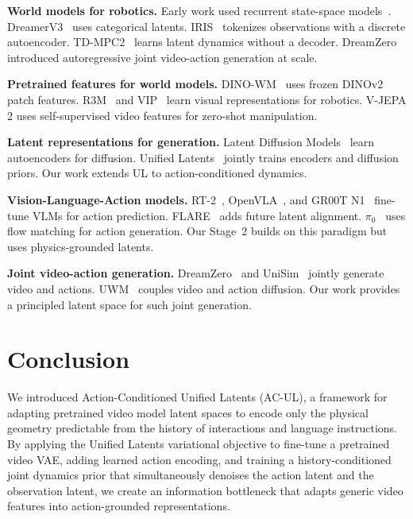 \documentclass{article}
\begin{document}
\textbf{World models for robotics.}
Early work used recurrent state-space models~\citep{ha2018world,hafner2019dream}. DreamerV3~\citep{hafner2023dreamerv3} uses categorical latents. IRIS~\citep{micheli2023transformers} tokenizes observations with a discrete autoencoder. TD-MPC2~\citep{hansen2024tdmpc2} learns latent dynamics without a decoder. DreamZero~\citep{dreamzero2025} introduced autoregressive joint video-action generation at scale.

\textbf{Pretrained features for world models.}
DINO-WM~\citep{zhou2024dinowm} uses frozen DINOv2 patch features. R3M~\citep{nair2022r3m} and VIP~\citep{ma2023vip} learn visual representations for robotics. V-JEPA 2 uses self-supervised video features for zero-shot manipulation.

\textbf{Latent representations for generation.}
Latent Diffusion Models~\citep{rombach2022high} learn autoencoders for diffusion. Unified Latents~\citep{heek2025ul} jointly trains encoders and diffusion priors. Our work extends UL to action-conditioned dynamics.

\textbf{Vision-Language-Action models.}
RT-2~\citep{brohan2023rt2}, OpenVLA~\citep{kim2024openvla}, and GR00T N1~\citep{nvidia2025groot} fine-tune VLMs for action prediction. FLARE~\citep{nvidia2025flare} adds future latent alignment. $\pi_0$~\citep{pi02024} uses flow matching for action generation. Our Stage~2 builds on this paradigm but uses physics-grounded latents.

\textbf{Joint video-action generation.}
DreamZero~\citep{dreamzero2025} and UniSim~\citep{yang2024unisim} jointly generate video and actions. UWM~\citep{zhu2025uwm} couples video and action diffusion. Our work provides a principled latent space for such joint generation.

\section{Conclusion}
\label{sec:conclusion}

We introduced Action-Conditioned Unified Latents (AC-UL), a framework for adapting pretrained video model latent spaces to encode only the physical geometry predictable from the history of interactions and language instructions.
By applying the Unified Latents variational objective to fine-tune a pretrained video VAE, adding learned action encoding, and training a history-conditioned joint dynamics prior that simultaneously denoises the action latent and the observation latent, we create an information bottleneck that adapts generic video features into action-grounded representations.
\end{document}
